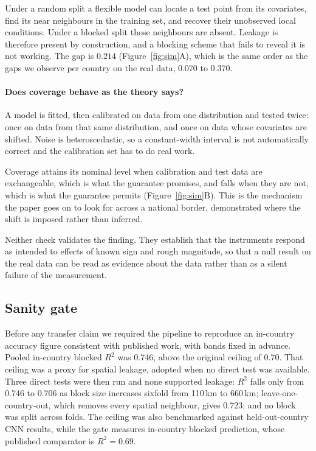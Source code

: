 \documentclass[11pt]{article}
\begin{document}
Under a random split a flexible model can locate a test point from its
covariates, find its near neighbours in the training set, and recover their
unobserved local conditions. Under a blocked split those neighbours are absent.
Leakage is therefore present by construction, and a blocking scheme that fails
to reveal it is not working. The gap is $0.214$ (Figure~\ref{fig:sim}A), which
is the same order as the gaps we observe per country on the real data, 0.070 to
0.370.

\paragraph{Does coverage behave as the theory says?} A model is fitted, then
calibrated on data from one distribution and tested twice: once on data from
that same distribution, and once on data whose covariates are shifted. Noise is
heteroscedastic, so a constant-width interval is not automatically correct and
the calibration set has to do real work.

Coverage attains its nominal level when calibration and test data are
exchangeable, which is what the guarantee promises, and falls when they are not,
which is what the guarantee permits (Figure~\ref{fig:sim}B). This is the
mechanism the paper goes on to look for across a national border, demonstrated
where the shift is imposed rather than inferred.

Neither check validates the finding. They establish that the instruments respond
as intended to effects of known sign and rough magnitude, so that a null result
on the real data can be read as evidence about the data rather than as a silent
failure of the measurement.

\subsection{Sanity gate}

Before any transfer claim we required the pipeline to reproduce an in-country
accuracy figure consistent with published work, with bands fixed in advance.
Pooled in-country blocked $R^2$ was 0.746, above the original ceiling of 0.70.
That ceiling was a proxy for spatial leakage, adopted when no direct test was
available. Three direct tests were then run and none supported leakage: $R^2$
falls only from 0.746 to 0.706 as block size increases sixfold from 110\,km to
660\,km; leave-one-country-out, which removes every spatial neighbour, gives
0.723; and no block was split across folds. The ceiling was also benchmarked
against held-out-country CNN results, while the gate measures in-country blocked
prediction, whose published comparator is $R^2 = 0.69$.
\end{document}
